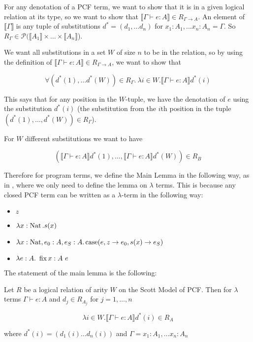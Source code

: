 \vspace{0.5cm}

For any denotation of a PCF term, we want to show that it is in a given logical relation at its type, so we want to show that $\llbracket \Gamma \vdash e : A \rrbracket \in R_{\Gamma \to A}$. An element of $\llbracket \Gamma \rrbracket$ is any tuple of substitutions $d^* = (d_1, \dots d_n)$ for $x_1 : A_1, \dots x_n :A_n = \Gamma$. So $R_\Gamma \in \mathcal{P}(\llbracket A_1 \rrbracket \times \dots \times \llbracket A_n \rrbracket$).

We want all substitutions in a set $W$ of size $n$  to be in the relation, so by using the definition of $\llbracket \Gamma \vdash e : A \rrbracket \in R_{\Gamma \to A}$, we want to show that 

\[ \forall (d^*(1), \dots d^*(W)) \in R_\Gamma. \ \lambda i \in W. \llbracket \Gamma \vdash e : A \rrbracket d^*(i)\]

This says that for any position in the $W$-tuple, we have the denotation of $e$ using the substitution $d^*(i)$ (the substitution from the $i$th position in the tuple $(d^*(1), \dots, d^*(W)) \in R_\Gamma$).

For $W$ different substitutions we want to have

\[(\llbracket \Gamma \vdash e : A \rrbracket d^*(1) , \dots, \llbracket \Gamma \vdash e : A \rrbracket d^*(W)) \in R_B \]

Therefore for program terms, we define the Main Lemma in the following way, as in \citep{Streicher06}, where we only need to define the lemma on $\lambda$ terms. This is because any closed PCF term can be written as a $\lambda$-term in the following way:

\begin{itemize}
\item{$z$}
\item{$\lambda x: \operatorname{Nat}. s(x)$}
\item{$\lambda x: \operatorname{Nat}, e_0 : A, e_S: A. \operatorname{case}(e,z \to e_0,s(x) \to e_S)$}
\item{$\lambda e: A . \ \fix x:A \ e $}
\end{itemize}

The statement of the main lemma is the following:

\vspace{0.5cm}

\begin{lem}\label{main2}
Let $R$ be a logical relation of arity $W$ on the Scott Model of PCF. Then for $\lambda$ terms $\Gamma \vdash e : A$ and $d_j \in R_{A_j}$ for $j = 1, \dots, n$

\[ \lambda i \in W. \llbracket \Gamma \vdash e : A \rrbracket d^*(i) \in R_A\]

where $d^*(i) = (d_1(i) \dots d_n(i))$ and $\Gamma = x_1 : A_1 , \dots x_n : A_n$
\end{lem}

